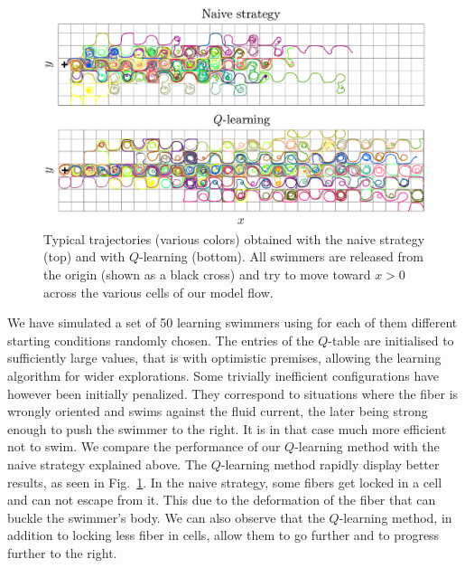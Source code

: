 \documentclass[aps,pre,reprint,superscriptaddress]{revtex4-2}
\begin{document}
\begin{figure}[ht]
  \centerline{\includegraphics[width=\columnwidth]{compare_traj}}
  \caption{\label{fig:compare_traj} Typical trajectories (various colors) obtained with the naive strategy (top) and with $Q$-learning (bottom). All swimmers are released from the origin (shown as a black cross) and try to move toward $x>0$ across the various cells of our model flow.}
\end{figure}
We have simulated a set of 50 learning swimmers using for each of them different starting conditions randomly chosen. The entries of the $Q$-table are initialised to sufficiently large values, that is with optimistic premises, allowing the learning algorithm for wider explorations. Some trivially inefficient configurations have however been initially penalized. They correspond to situations where the fiber is wrongly oriented and swims against the fluid current, the later being strong enough to push the swimmer to the right. It is in that case much more efficient not to swim. We compare the performance of our $Q$-learning method with the naive strategy explained above. The $Q$-learning method rapidly display better results, as seen in Fig.~\ref{fig:compare_traj}. In the naive strategy, some fibers get locked in a cell and can not escape from it. This due to the deformation of the fiber that can buckle the swimmer's body. We can also observe that the $Q$-learning method, in addition to locking less fiber in cells, allow them to go further and to progress further to the right.
\end{document}
